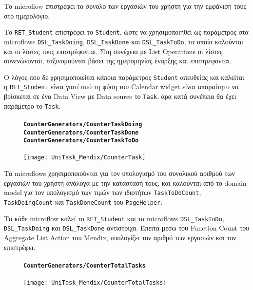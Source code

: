                 Το microflow επιστρέφει το σύνολο των εργασιών του χρήστη για την εμφάνισή τους στο ημερολόγιο.

                Το \texttt{RET\_Student} επιστρέφει το \texttt{Student}, ώστε να χρησιμοποιηθεί ως παράμετρος στα microflows \texttt{DSL\_TaskDoing}, \texttt{DSL\_TaskDone} και \texttt{DSL\_TaskToDo}, τα οποία καλούνται και οι λίστες τους επιστρέφονται. Στη συνέχεια με List Operations οι λίστες συνενώνονται, ταξινομούνται βάσει της ημερομηνίας έναρξης και επιστρέφονται.

                Ο λόγος που δε χρησιμοποιείται κάποια παράμετρος \texttt{Student} απευθείας και καλείται η \texttt{RET\_Student} είναι γιατί από τη φύση του Calendar widget είναι απαραίτητο να βρίσκεται σε ένα Data View με Data source το \texttt{Task}, άρα κατά συνέπεια θα έχει παράμετρο το \texttt{Task}.

                \begin{figure}[H] \noindent
                    \paragraph{\texttt{CounterGenerators/CounterTaskDoing} \\ \texttt{CounterGenerators/CounterTaskDone} \\ \texttt{CounterGenerators/CounterTaskToDo}}
                    \begin{center}
                        \texttt{[image: UniTask\_Mendix/CounterTask]}
                    \end{center}
                \end{figure}

                Τα microflows χρησιμοποιούνται για τον υπολογισμό του συνολικού αριθμού των εργασιών του χρήστη ανάλογα με την κατάστασή τους, και καλούνται από το domain model για τον υπολογισμό των τιμών των ιδιοτήτων \texttt{TaskToDoCount}, \texttt{TaskDoingCount} και \texttt{TaskDoneCount} του \texttt{PageHelper}.

                Το κάθε microflow καλεί το \texttt{RET\_Student} και τα microflows \texttt{DSL\_TaskToDo}, \texttt{DSL\_TaskDoing} και \texttt{DSL\_TaskDone} αντίστοιχα. Έπειτα μέσω του Function Count του Aggregate List Action του Mendix, υπολογίζει τον αριθμό των εργασιών και τον επιστρέφει.

                \begin{figure}[H] \noindent
                    \paragraph{\texttt{CounterGenerators/CounterTotalTasks}}
                    \begin{center}
                        \texttt{[image: UniTask\_Mendix/CounterTotalTasks]}
                    \end{center}
                \end{figure}

